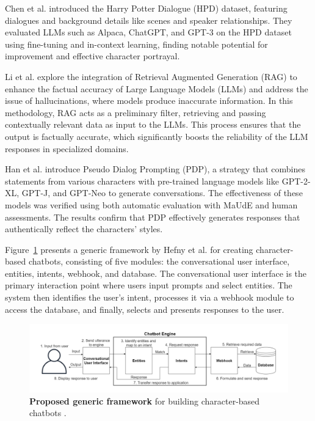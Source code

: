 \documentclass[fleqn,moreauthors,10pt]{ds_report}
\begin{document}
Chen et al. \cite{chen2023large} introduced the Harry Potter Dialogue (HPD) dataset, featuring dialogues and background details like scenes and speaker relationships. They evaluated LLMs such as Alpaca, ChatGPT, and GPT-3 on the HPD dataset using fine-tuning and in-context learning, finding notable potential for improvement and effective character portrayal.

Li et al. \cite{li2024enhancing} explore the integration of Retrieval Augmented Generation (RAG) to enhance the factual accuracy of Large Language Models (LLMs) and address the issue of hallucinations, where models produce inaccurate information. In this methodology, RAG acts as a preliminary filter, retrieving and passing contextually relevant data as input to the LLMs. This process ensures that the output is factually accurate, which significantly boosts the reliability of the LLM responses in specialized domains.

Han et al. \cite{han2022meet} introduce Pseudo Dialog Prompting (PDP), a strategy that combines statements from various characters with pre-trained language models like GPT-2-XL, GPT-J, and GPT-Neo to generate conversations. The effectiveness of these models was verified using both automatic evaluation with MaUdE and human assessments. The results confirm that PDP effectively generates responses that authentically reflect the characters' styles.

Figure~\ref{fig:generic_framework} presents a generic framework by Hefny et al. \cite{generic_framework} for creating character-based chatbots, consisting of five modules: the conversational user interface, entities, intents, webhook, and database. The conversational user interface is the primary interaction point where users input prompts and select entities. The system then identifies the user's intent, processes it via a webhook module to access the database, and finally, selects and presents responses to the user.

\begin{figure}[ht]
        \centering 
	\includegraphics[width=\linewidth]{fig/general_framework_from_article.png}
	\caption{\textbf{Proposed generic framework} for building character-based chatbots \cite{generic_framework}.}
	\label{fig:generic_framework}
\end{figure}
\end{document}
